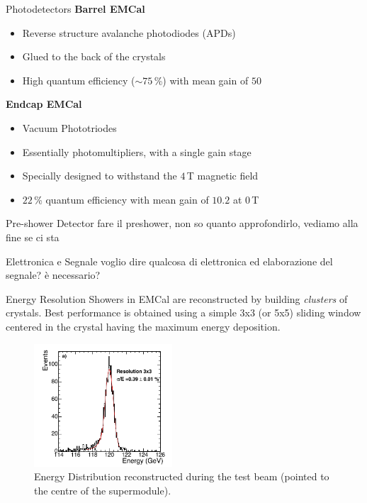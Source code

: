 \documentclass[10pt]{beamer}
\begin{document}
\begin{frame}{Photodetectors}
    \textbf{Barrel EMCal}
    \begin{itemize}
        \item Reverse structure avalanche photodiodes (APDs)
        \item Glued to the back of the crystals
        \item High quantum efficiency ($\sim 75$\,\%) with mean gain of $50$
    \end{itemize}{}
    
    \textbf{Endcap EMCal}
    \begin{itemize}
        \item Vacuum Phototriodes
        \item Essentially photomultipliers, with a single gain stage
        \item Specially designed to withstand the $4$\,T magnetic field
        \item $22$\,\% quantum efficiency with mean gain of $10.2$ at $0$\,T
    \end{itemize}
\end{frame}

\begin{frame}{Pre-shower Detector}
        fare il preshower, non so quanto approfondirlo, vediamo alla fine se ci sta
\end{frame}

\begin{frame}{Elettronica e Segnale}
    voglio dire qualcosa di elettronica ed elaborazione del segnale? è necessario?
\end{frame}

\begin{frame}{Energy Resolution}
    Showers in EMCal are reconstructed by building \emph{clusters} of crystals. Best performance is obtained using a simple 3x3 (or 5x5) sliding window centered in the crystal having the maximum energy deposition.
    \begin{figure}
        \centering
        \includegraphics[height=130pt]{./img/resolution_1.png}
        \caption{Energy Distribution reconstructed during the test beam (pointed to the centre of the supermodule).}
        \label{fig:res1}
    \end{figure}{}
\end{frame}
\end{document}
